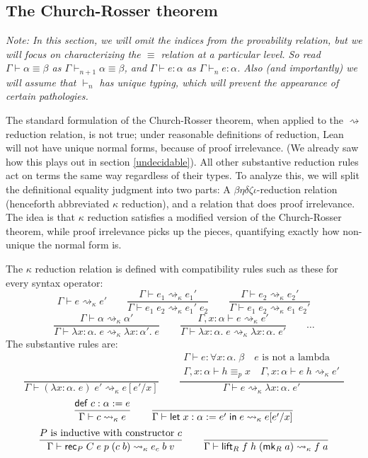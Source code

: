 \subsection{The Church-Rosser theorem}
\emph{Note: In this section, we will omit the indices from the provability relation, but we will focus on characterizing the $\equiv$ relation at a particular level. So read $\Gamma\vdash \alpha\equiv\beta$ as $\Gamma\vdash_{n+1} \alpha\equiv\beta$, and $\Gamma\vdash e:\alpha$ as $\Gamma\vdash_n e:\alpha$. Also (and importantly) we will assume that $\vdash_n$ has unique typing, which will prevent the appearance of certain pathologies.}

The standard formulation of the Church-Rosser theorem, when applied to the $\rightsquigarrow$ reduction relation, is not true; under reasonable definitions of reduction, Lean will not have unique normal forms, because of proof irrelevance. (We already saw how this plays out in section \ref{undecidable}). All other substantive reduction rules act on terms the same way regardless of their types. To analyze this, we will split the definitional equality judgment into two parts: A $\beta\eta\delta\zeta\iota$-reduction relation (henceforth abbreviated $\kappa$ reduction), and a relation that does proof irrelevance. The idea is that $\kappa$ reduction satisfies a modified version of the Church-Rosser theorem, while proof irrelevance picks up the pieces, quantifying exactly how non-unique the normal form is.

The $\kappa$ reduction relation is defined with compatibility rules such as these for every syntax operator:
$$\boxed{\Gamma\vdash e\rightsquigarrow_\kappa e'}\qquad
\frac{\Gamma\vdash e_1 \rightsquigarrow_\kappa e_1'}{\Gamma\vdash e_1\;e_2\rightsquigarrow_\kappa e_1'\;e_2}\qquad
\frac{\Gamma\vdash e_2 \rightsquigarrow_\kappa e_2'}{\Gamma\vdash e_1\;e_2\rightsquigarrow_\kappa e_1\;e_2'}$$
$$\frac{\Gamma\vdash \alpha \rightsquigarrow_\kappa\alpha'}{\Gamma\vdash \lambda x:\alpha.\;e\rightsquigarrow_\kappa \lambda x:\alpha'.\;e}\qquad
\frac{\Gamma,x:\alpha\vdash e \rightsquigarrow_\kappa e'}{\Gamma\vdash \lambda x:\alpha.\;e\rightsquigarrow_\kappa \lambda x:\alpha.\;e'}\qquad\dots$$
The substantive rules are:
$$\frac{}{\Gamma\vdash (\lambda x:\alpha.\;e)\;e'\rightsquigarrow_\kappa e[e'/x]}\qquad
\frac{\begin{matrix}
\Gamma\vdash e:\forall x:\alpha.\;\beta\quad e\mbox{ is not a lambda}\\
\Gamma,x:\alpha\vdash h\equiv_p x\quad \Gamma,x:\alpha\vdash e\;h\rightsquigarrow_\kappa e'
\end{matrix}}{\Gamma\vdash e\rightsquigarrow_\kappa\lambda x:\alpha.\;e'}$$
$$\frac{\mathsf{def}\;c:\alpha:=e}{\Gamma\vdash c\rightsquigarrow_\kappa e}\qquad
\frac{}{\Gamma\vdash \elet{x:\alpha:=e'}{e}\rightsquigarrow_\kappa e[e'/x]}$$
$$\frac{P\mbox{ is inductive with constructor }c}{\Gamma\vdash \rec_P\;C\;e\;p\;(c\;b)\rightsquigarrow_\kappa e_c\;b\;v}\qquad
\frac{}{\Gamma\vdash \lift_R\;f\;h\;(\mk_R\;a)\rightsquigarrow_\kappa f\;a}$$

